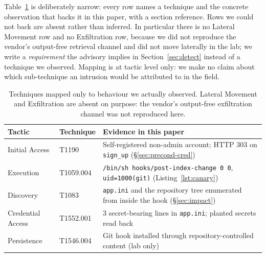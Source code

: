 Table~\ref{tab:attack} is deliberately narrow: every row names a technique and the
concrete observation that backs it in this paper, with a section reference. Rows we
could not back are absent rather than inferred. In particular there is no Lateral
Movement row and no Exfiltration row, because we did not reproduce the vendor's
output-free retrieval channel and did not move laterally in the lab; we write a
\emph{requirement} the advisory implies in Section~\ref{sec:detect} instead of a
technique we observed. Mapping is at tactic level only: we make no claim about which
sub-technique an intrusion would be attributed to in the field.

\begin{table}[t]
\centering
\footnotesize
\begin{tabular}{@{}p{1.3cm}p{2.0cm}p{4.2cm}@{}}
\toprule
Tactic & Technique & Evidence in this paper \\
\midrule
Initial Access & T1190 & Self-registered non-admin account; HTTP 303 on
\texttt{sign\_up} (\S\ref{sec:precond-cred}) \\
Execution & T1059.004 & \texttt{/bin/sh hooks/}\allowbreak\texttt{post-index-change
0 0}, \texttt{uid=1000(git)} (Listing~\ref{lst:canary}) \\
Discovery & T1083 & \texttt{app.ini} and the repository tree enumerated from
inside the hook (\S\ref{sec:impact}) \\
Credential Access & T1552.001 & 3 secret-bearing lines in \texttt{app.ini};
planted secrets read back \\
Persistence & T1546.004 & Git hook installed through repository-controlled
content (lab only) \\
\bottomrule
\end{tabular}
\caption{Techniques mapped only to behaviour we actually observed. Lateral
Movement and Exfiltration are absent on purpose: the vendor's output-free
exfiltration channel was not reproduced here.}
\label{tab:attack}
\end{table}
